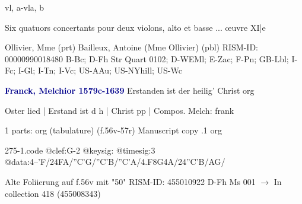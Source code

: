 \documentclass[twocolumn]{book}
\begin{document}
 vl, a-vla, b
\newline \begin{itshape}Six quatuors concertants pour deux violons, alto et basse ... œuvre XI|e\end{itshape} 
\newline Ollivier, Mme  (prt)
\newline Bailleux, Antoine (Mme Ollivier)  (pbl)
\newline RISM-ID: 00000990018480
\newline B-Bc; D-Fh  Str Quart 0102; D-WEMl; E-Zac; F-Pn; GB-Lbl; I-Fc; I-Gl; I-Tn; I-Vc; US-AAu; US-NYhill; US-Wc
\newline \par \vspace{7pt} \textcolor{darkblue}{\textbf{Franck, Melchior  1579c-1639}}
\newline Erstanden ist der heilig' Christ
\newline org
\newline \begin{itshape}[f.56v, at left:] Oster lied | Erstand ist d h | Christ pp | Compos. Melch: frank\end{itshape} 
\newline \textcolor{darkblue}{}  1 parts: org (tabulature)  (f.56v-57r)
\newline Manuscript copy
.1  org  
\begin{filecontents*}{275-1.code}
@clef:G-2
@keysig:
@timesig:3
@data:4--'F/24FA/''C'G/''C'B/''C'A/4.F8G4A/24''C'B/AG/
\end{filecontents*}
\newline
%

\newline Alte Foliierung auf f.56v mit "50"
\newline RISM-ID: 455010922
\newline D-Fh  Ms 001
\newline $\rightarrow$ In collection 418 (455008343)
      
\end{document}
